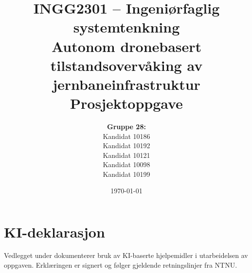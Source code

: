 \documentclass{article}
\title{
    \large INGG2301 -- Ingeniørfaglig systemtenkning \\[0.5em]
    \Large Autonom dronebasert tilstandsovervåking av jernbaneinfrastruktur \\[0.5em]
    \large Prosjektoppgave
}
\author{
    \textbf{Gruppe 28:} \\
    Kandidat 10186 \\ %
    Kandidat 10192\\ %
    Kandidat 10121\\ %
    Kandidat 10098\\ %
    Kandidat 10199 %
}
\date{\today}
\begin{document}
\maketitle

\newpage

\tableofcontents
\newpage

\listoffigures
\newpage

\listoftables
\newpage

\setcounter{page}{1}     %






\newpage
\printbibliography[heading = bibintoc, title = Litteraturliste]

\newpage
\appendix



\section{KI-deklarasjon}
Vedlegget under dokumenterer bruk av KI-baserte hjelpemidler i utarbeidelsen av oppgaven. Erklæringen er signert og følger gjeldende retningslinjer fra NTNU.

\end{document}
